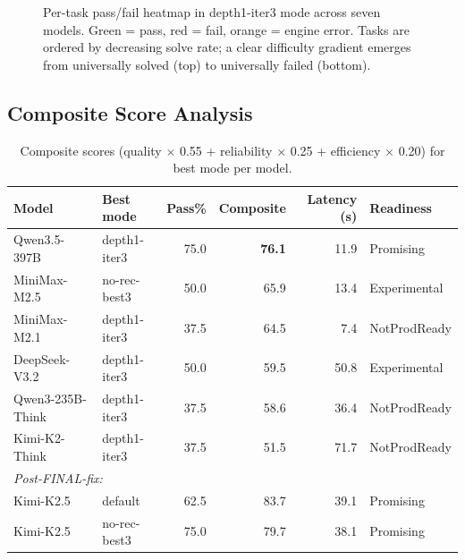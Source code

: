 \documentclass[11pt]{article}
\begin{document}
\begin{figure}[t]
\caption{Per-task pass/fail heatmap in depth1-iter3 mode across seven models. Green = pass, red = fail, orange = engine error. Tasks are ordered by decreasing solve rate; a clear difficulty gradient emerges from universally solved (top) to universally failed (bottom).}
\label{fig:pertask-heatmap}
\end{figure}

\subsection{Composite Score Analysis}

\begin{table}[t]
\centering
\caption{Composite scores (quality $\times$ 0.55 + reliability $\times$ 0.25 + efficiency $\times$ 0.20) for best mode per model.}
\label{tab:composite-multimodel}
\begin{tabular}{llrrrl}
\toprule
Model & Best mode & Pass\% & Composite & Latency (s) & Readiness \\
\midrule
Qwen3.5-397B & depth1-iter3 & 75.0 & \textbf{76.1} & 11.9 & Promising \\
MiniMax-M2.5 & no-rec-best3 & 50.0 & 65.9 & 13.4 & Experimental \\
MiniMax-M2.1 & depth1-iter3 & 37.5 & 64.5 & 7.4 & NotProdReady \\
DeepSeek-V3.2 & depth1-iter3 & 50.0 & 59.5 & 50.8 & Experimental \\
Qwen3-235B-Think & depth1-iter3 & 37.5 & 58.6 & 36.4 & NotProdReady \\
Kimi-K2-Think & depth1-iter3 & 37.5 & 51.5 & 71.7 & NotProdReady \\
\midrule
\multicolumn{6}{l}{\emph{Post-FINAL-fix:}} \\
Kimi-K2.5 & default & 62.5 & 83.7 & 39.1 & Promising \\
Kimi-K2.5 & no-rec-best3 & 75.0 & 79.7 & 38.1 & Promising \\
\bottomrule
\end{tabular}
\end{table}
\end{document}

